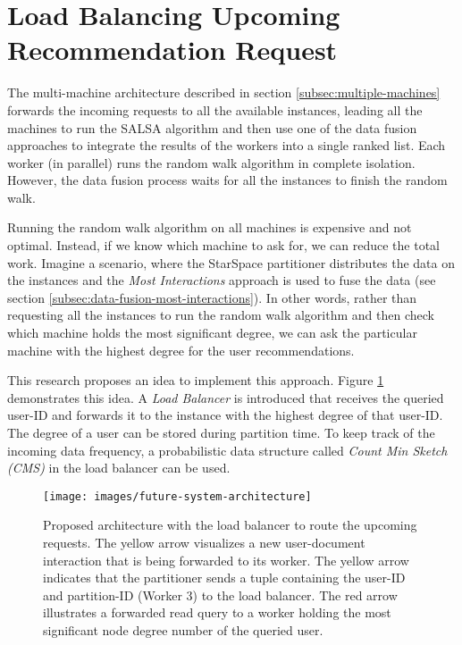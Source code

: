 \section{Load Balancing Upcoming Recommendation Request}
\label{sec:load-balancing}
The multi-machine architecture described in section \ref{subsec:multiple-machines} forwards the incoming requests to all the available instances, leading all the machines to run the SALSA algorithm and then use one of the data fusion approaches to integrate the results of the workers into a single ranked list. Each worker (in parallel) runs the random walk algorithm in complete isolation. However, the data fusion process waits for all the instances to finish the random walk. 


Running the random walk algorithm on all machines is expensive and not optimal. Instead, if we know which machine to ask for, we can reduce the total work. Imagine a scenario, where the StarSpace partitioner distributes the data on the instances and the \emph{Most Interactions} approach is used to fuse the data (see section \ref{subsec:data-fusion-most-interactions}). In other words, rather than requesting all the instances to run the random walk algorithm and then check which machine holds the most significant degree, we can ask the particular machine with the highest degree for the user recommendations.

This research proposes an idea to implement this approach. Figure \ref{fig:loadbalancer} demonstrates this idea. A \emph{Load Balancer} is introduced that receives the queried user-ID and forwards it to the instance with the highest degree of that user-ID. The degree of a user can be stored during partition time. To keep track of the incoming data frequency, a probabilistic data structure called \emph{Count Min Sketch (CMS)} \cite{cormodeImprovedDataStream2005} in the load balancer can be used.


\begin{figure}[!htb]
    \centering
    \texttt{[image: images/future-system-architecture]}
    \caption{Proposed architecture with the load balancer to route the upcoming requests. The yellow arrow visualizes a new user-document interaction that is being forwarded to its worker. The yellow arrow indicates that the partitioner sends a tuple containing the user-ID and partition-ID (Worker 3) to the load balancer. The red arrow illustrates a forwarded read query to a worker holding the most significant node degree number of the queried user.}
    \label{fig:loadbalancer}
\end{figure}


